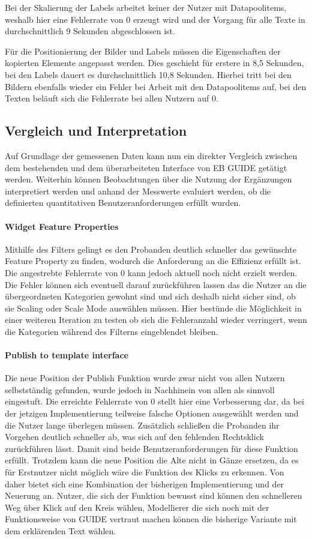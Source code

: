 Bei der Skalierung der Labels arbeitet keiner der Nutzer mit Datapoolitems, weshalb hier eine Fehlerrate von 0 erzeugt wird und der Vorgang für alle Texte in durchschnittlich 9 Sekunden abgeschlossen ist.

Für die Positionierung der Bilder und Labels müssen die Eigenschaften der kopierten Elemente angepasst werden.
Dies geschieht für erstere in 8,5 Sekunden, bei den Labels dauert es durchschnittlich 10,8 Sekunden.
Hierbei tritt bei den Bildern ebenfalls wieder ein Fehler bei Arbeit mit den Datapoolitems auf, bei den Texten beläuft sich die Fehlerrate bei allen Nutzern auf 0.

\subsection{Vergleich und Interpretation}Auf Grundlage der gemessenen Daten kann nun ein direkter Vergleich zwischen dem bestehenden und dem überarbeiteten Interface von EB GUIDE getätigt werden.
Weiterhin können Beobachtungen über die Nutzung der Ergänzungen interpretiert werden und anhand der Messwerte evaluiert werden, ob die definierten quantitativen Benutzeranforderungen erfüllt wurden.

\paragraph{Widget Feature Properties}
Mithilfe des Filters gelingt es den Probanden deutlich schneller das gewünschte Feature Property zu finden, wodurch die Anforderung an die Effizienz erfüllt ist.
Die angestrebte Fehlerrate von 0 kann jedoch aktuell noch nicht erzielt werden.
Die Fehler können sich eventuell darauf zurückführen lassen das die Nutzer an die übergeordneten Kategorien gewohnt sind und sich deshalb nicht sicher sind, ob sie Scaling oder Scale Mode auswählen müssen.
Hier bestünde die Möglichkeit in einer weiteren Iteration zu testen ob sich die Fehleranzahl wieder verringert, wenn die Kategorien während des Filterns eingeblendet bleiben.

\paragraph{Publish to template interface}
Die neue Position der Publish Funktion wurde zwar nicht von allen Nutzern selbstständig gefunden, wurde jedoch in Nachhinein von allen als sinnvoll eingestuft.
Die erreichte Fehlerrate von 0 stellt hier eine Verbesserung dar, da bei der jetzigen Implementierung teilweise falsche Optionen ausgewählt werden und die Nutzer lange überlegen müssen.
Zusätzlich schließen die Probanden ihr Vorgehen deutlich schneller ab, was sich auf den fehlenden Rechtsklick zurückführen lässt.
Damit sind beide Benutzeranforderungen für diese Funktion erfüllt.
Trotzdem kann die neue Position die Alte nicht in Gänze ersetzen, da es für Erstnutzer nicht möglich wäre die Funktion des Klicks zu erkennen.
Von daher bietet sich eine Kombination der bisherigen Implementierung und der Neuerung an.
Nutzer, die sich der Funktion bewusst sind können den schnelleren Weg über Klick auf den Kreis wählen, Modellierer die sich noch mit der Funktionsweise von GUIDE vertraut machen können die bisherige Variante mit dem erklärenden Text wählen.

